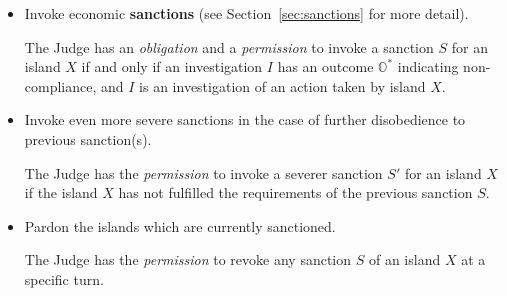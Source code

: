 \begin{itemize}
\begin{itemize}
        \item Invoke economic \textbf{sanctions} (see Section~\ref{sec:sanctions} for more detail).
        \begin{rule_IIGO}
            The Judge has an \emph{obligation} and a \emph{permission} to invoke a sanction $S$ for an island $X$ if and only if an investigation $I$ has an outcome $\mathbb{O}^{*}$ indicating non-compliance, and $I$ is an investigation of an action taken by island $X$.
        \end{rule_IIGO}
        \item Invoke even more severe sanctions in the case of further disobedience to previous sanction(s).
        \begin{rule_IIGO}
            The Judge has the \emph{permission} to invoke a severer sanction $S'$ for an island $X$ if the island $X$ has not fulfilled the requirements of the previous sanction $S$.
        \end{rule_IIGO}
        \item Pardon the islands which are currently sanctioned.
        \begin{rule_IIGO}
            The Judge has the \emph{permission} to revoke any sanction $S$ of an island $X$ at a specific turn.
        \end{rule_IIGO}
    \end{itemize}
\end{itemize}

